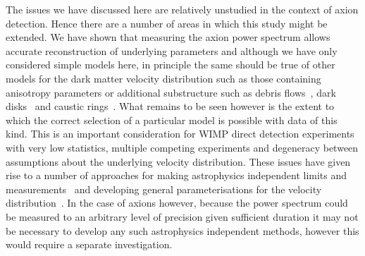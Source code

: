 The issues we have discussed here are relatively unstudied in the context of axion detection. Hence there are a number of areas in which this study might be extended. We have shown that measuring the axion power spectrum allows accurate reconstruction of underlying parameters and although we have only considered simple models here, in principle the same should be true of other models for the dark matter velocity distribution such as those containing anisotropy parameters or additional substructure such as debris flows~\cite{Kuhlen:2012fz}, dark disks~\cite{Schaller:2016uot} and caustic rings~\cite{Duffy:2008dk}. What remains to be seen however is the extent to which the correct selection of a particular model is possible with data of this kind. This is an important consideration for WIMP direct detection experiments with very low statistics, multiple competing experiments and degeneracy between assumptions about the underlying velocity distribution. These issues have given rise to a number of approaches for making astrophysics independent limits and measurements~\cite{Frandsen:2011gi,Fox:2010bu,Gondolo:2012rs,DelNobile:2013cta,Fox:2014kua,Feldstein:2014gza,Kahlhoefer:2016eds,Gelmini:2016pei} and developing general parameterisations for the velocity distribution~\cite{Peter:2011eu,Kavanagh:2013wba,Kavanagh:2013eya,Kavanagh:2016xfi}. In the case of axions however, because the power spectrum could be measured to an arbitrary level of precision given sufficient duration it may not be necessary to develop any such astrophysics independent methods, however this would require a separate investigation. 

